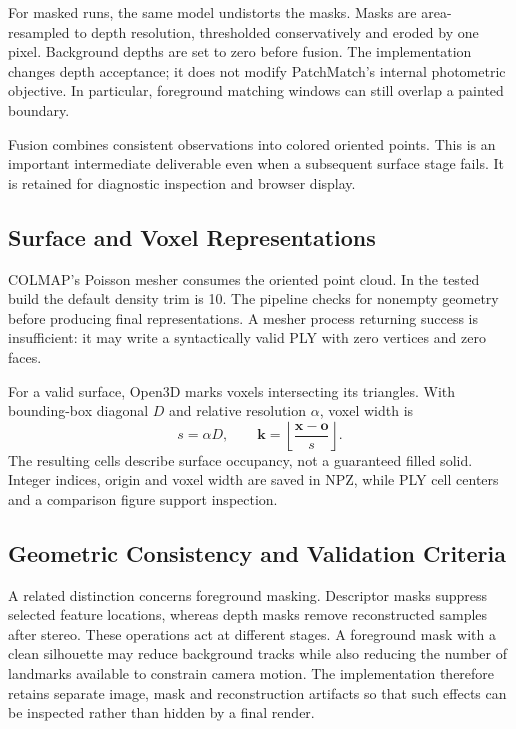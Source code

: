 \documentclass[conference]{IEEEtran}
\begin{document}
For masked runs, the same model undistorts the masks. Masks are area-resampled to depth resolution, thresholded conservatively and eroded by one pixel. Background depths are set to zero before fusion. The implementation changes depth acceptance; it does not modify PatchMatch's internal photometric objective. In particular, foreground matching windows can still overlap a painted boundary.

Fusion combines consistent observations into colored oriented points. This is an important intermediate deliverable even when a subsequent surface stage fails. It is retained for diagnostic inspection and browser display.

\subsection{Surface and Voxel Representations}
COLMAP's Poisson mesher consumes the oriented point cloud. In the tested build the default density trim is 10. The pipeline checks for nonempty geometry before producing final representations. A mesher process returning success is insufficient: it may write a syntactically valid PLY with zero vertices and zero faces.

For a valid surface, Open3D marks voxels intersecting its triangles. With bounding-box diagonal $D$ and relative resolution $\alpha$, voxel width is
\begin{equation}
s=\alpha D,\qquad\mathbf{k}=\left\lfloor\frac{\mathbf{x}-\mathbf{o}}{s}\right\rfloor.
\end{equation}
The resulting cells describe surface occupancy, not a guaranteed filled solid. Integer indices, origin and voxel width are saved in NPZ, while PLY cell centers and a comparison figure support inspection.


\subsection{Geometric Consistency and Validation Criteria}
A related distinction concerns foreground masking. Descriptor masks suppress selected feature locations, whereas depth masks remove reconstructed samples after stereo. These operations act at different stages. A foreground mask with a clean silhouette may reduce background tracks while also reducing the number of landmarks available to constrain camera motion. The implementation therefore retains separate image, mask and reconstruction artifacts so that such effects can be inspected rather than hidden by a final render.
\end{document}
